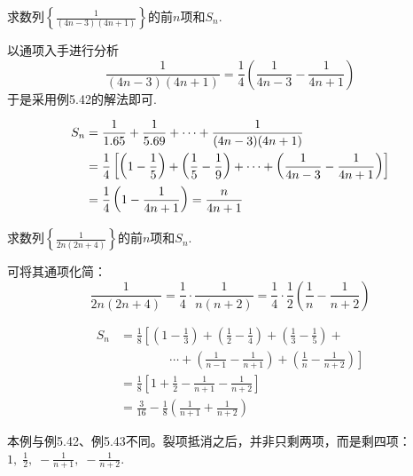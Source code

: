 \begin{example}
    求数列$\left\{\frac{1}{(4n-3)(4n+1)}\right\}$的前$n$项和$S_n$.
\end{example}

\begin{analyze}
以通项入手进行分析
\[\frac{1}{(4n-3)(4n+1)}=\frac{1}{4}\left(\frac{1}{4n-3}-\frac{1}{4n+1}\right)\]
于是采用例5.42的解法即可.
\end{analyze}

\begin{solution}
\[\begin{split}
S_n&=\dfrac{1}{1.6 5}+\dfrac{1}{5.6 9}+\cdots +\dfrac{1}{(4n-3)(4n+1)}\\
&=\dfrac{1}{4}\left[\left(1-\dfrac{1}{5}\right)+\left(\dfrac{1}{5}-\dfrac{1}{9}\right)+\cdots +\left(\dfrac{1}{4n-3}-\dfrac{1}{4n+1}\right)\right]\\
&=\dfrac{1}{4}\left(1-\dfrac{1}{4n+1}\right)=\dfrac{n}{4n+1}
\end{split}\]    
\end{solution}


\begin{example}
    求数列$\left\{\frac{1}{2n(2n+4)}\right\}$的前$n$项和$S_n$.
\end{example}

\begin{analyze}
    可将其通项化简：
\[\frac{1}{2n(2n+4)}=\frac{1}{4}\cdot \frac{1}{n(n+2)}=\frac{1}{4}\cdot \frac{1}{2}\left(\frac{1}{n}-\frac{1}{n+2}\right)\]
\end{analyze}

\begin{solution}
\[\begin{split}
S_n&=\frac{1}{8}\left[\left(1-\frac{1}{3}\right)+\left(\frac{1}{2}-\frac{1}{4}\right)+\left(\frac{1}{3}-\frac{1}{5}\right)+\right.\\
&\qquad \qquad \left.\cdots +\left(\frac{1}{n-1}-\frac{1}{n+1}\right)+\left(\frac{1}{n}-\frac{1}{n+2}\right)\right]\\
&=\frac{1}{8}\left[1+\frac{1}{2}-\frac{1}{n+1}-\frac{1}{n+2}\right]\\
&=\frac{3}{16}-\frac{1}{8}\left(\frac{1}{n+1}+\frac{1}{n+2}\right)
\end{split}\]
\end{solution}

\begin{rmk}
本例与例5.42、例5.43不同。裂项抵消之后，并非只剩两项，而是剩四项：$1,\; \frac{1}{2},\; -\frac{1}{n+1},\; -\frac{1}{n+2}$.
\end{rmk}
    
